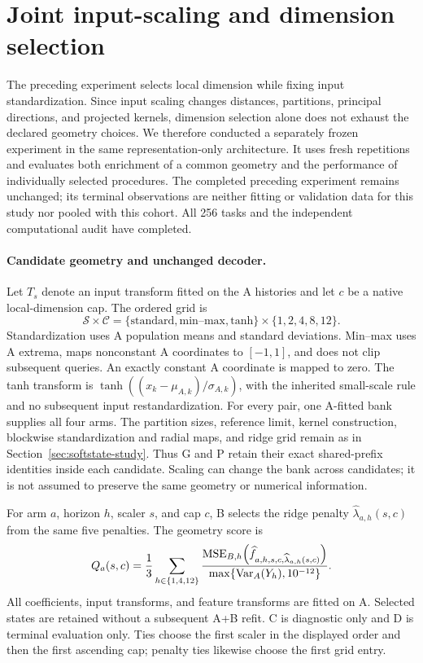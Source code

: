 \section{Joint input-scaling and dimension selection}
\label{sec:joint-selection}

The preceding experiment selects local dimension while fixing input
standardization. Since input scaling changes distances, partitions,
principal directions, and projected kernels, dimension selection alone
does not exhaust the declared geometry choices. We therefore conducted
a separately frozen experiment in the same representation-only architecture.
It uses fresh repetitions and evaluates both enrichment of a common
geometry and the performance of individually selected procedures.
The completed preceding experiment remains unchanged; its terminal
observations are neither fitting or validation data for this study
nor pooled with this cohort. All 256 tasks and the independent
computational audit have completed.

\paragraph{Candidate geometry and unchanged decoder.}
Let $T_s$ denote an input transform fitted on the A histories and let
$c$ be a native local-dimension cap. The ordered grid is
\[
 \mathcal S\times\mathcal C
 =\{\text{standard},\text{min--max},\text{tanh}\}
   \times\{1,2,4,8,12\}.
\]
Standardization uses A population means and standard deviations.
Min--max uses A extrema, maps nonconstant A coordinates to $[-1,1]$,
and does not clip subsequent queries. An exactly constant A coordinate
is mapped to zero. The tanh transform is
$\tanh((x_k-\mu_{A,k})/\sigma_{A,k})$, with the inherited
small-scale rule and no subsequent input restandardization.
For every pair, one A-fitted bank supplies all four arms. The
partition sizes, reference limit, kernel construction, blockwise
standardization and radial maps, and ridge grid remain as in
Section~\ref{sec:softstate-study}. Thus G and P retain their exact
shared-prefix identities inside each candidate. Scaling can change
the bank across candidates; it is not assumed to preserve the same
geometry or numerical information.

For arm $a$, horizon $h$, scaler $s$, and cap $c$, B selects the ridge
penalty $\widehat\lambda_{a,h}(s,c)$ from the same five penalties.
The geometry score is
\begin{equation}
 Q_a(s,c)=\frac{1}{3}\sum_{h\in\{1,4,12\}}
 \frac{\operatorname{MSE}_{B,h}\!\left(\widehat f_{a,h,s,c,
       \widehat\lambda_{a,h}(s,c)}\right)}
 {\max\{\operatorname{Var}_A(Y_h),10^{-12}\}}.
 \label{eq:joint-selection-score}
\end{equation}
All coefficients, input transforms, and feature transforms are fitted
on A. Selected states are retained without a subsequent A+B refit.
C is diagnostic only and D is terminal evaluation only. Ties choose
the first scaler in the displayed order and then the first ascending
cap; penalty ties likewise choose the first grid entry.

